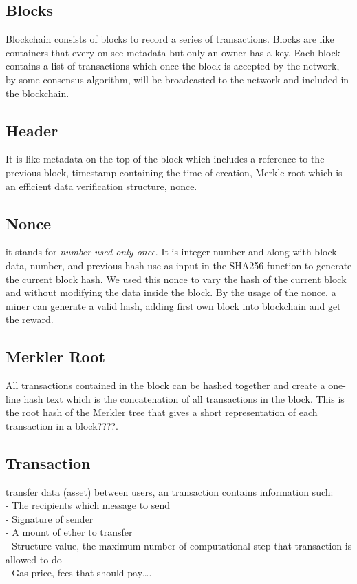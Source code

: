 \subsection{Blocks} Blockchain consists of blocks to record a series of transactions. Blocks are like containers that every on see metadata but only an owner has a key. Each block contains a list of transactions which once the block is accepted by the network, by some consensus algorithm, will be broadcasted to the network and included in the blockchain\cite{Egbertseng}. 

\subsection{Header} It is like metadata on the top of the block which includes a reference to the previous block, timestamp containing the time of creation, Merkle root which is an efficient data verification structure, nonce\cite{Kevin}.
\subsection{Nonce} it stands for \textit{number used only once}. It is integer number and along with block data, number, and previous hash use as input in the SHA256 function to generate the current block hash. We used this nonce to vary the hash of the current block and without modifying the data inside the block. By the usage of the nonce, a miner can generate a valid hash, adding first own block into blockchain and get the reward\cite{Gavin}.
\subsection{Merkler Root}
All transactions contained in the block can be hashed together and create a one-line hash text which is the concatenation of all transactions in the block. This is the root hash of the Merkler tree that gives a short representation of each transaction in a block????.

\subsection{Transaction} transfer data (asset) between users, an transaction contains information such:\\
- The recipients which message to send\\
- Signature of sender \\
- A mount of ether to transfer\\
- Structure value, the maximum number of computational step that transaction is allowed to do \\
- Gas price, fees that should pay…\cite{Egbertsen}.\\

